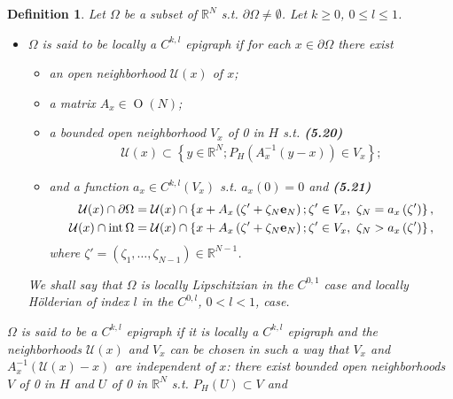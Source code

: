 \documentclass{book}
\numberwithin{equation}{section}
\newtheorem{definition}{Definition}[section]
\begin{document}
\begin{enumerate}
    \begin{definition}
        Let $\Omega$ be a subset of $\mathbb{R}^N$ s.t. $\partial\Omega\ne\emptyset$. Let $k\ge 0$, $0\le l\le 1$.
        \begin{itemize}
            \item[(i)] $\Omega$ is said to be \emph{locally a $C^{k,l}$ epigraph} if for each $x\in\partial\Omega$ there exist
            \begin{itemize}
                \item[(a)] an open neighborhood $\mathcal{U}(x)$ of $x$;
                \item[(b)] a matrix $A_x\in\operatorname{O}(N)$;
                \item[(c)] a bounded open neighborhood $V_x$ of 0 in $H$ s.t. \textbf{(5.20)}
                \begin{align*}
                    \mathcal{U}(x)\subset\left\{y\in\mathbb{R}^N;P_H\left(A_x^{-1}\left(y - x\right)\right)\in V_x\right\};
                \end{align*}
                \item[(d)] and a function $a_x\in C^{k,l}(V_x)$ s.t. $a_x(0) = 0$ and \textbf{(5.21)}
                \begin{align*}
                    \mathcal{U}(x)\cap\partial\Omega &= \mathcal{U}(x)\cap\left\{x + A_x\left(\zeta' + \zeta_N{\bf e}_N\right);\zeta'\in V_x,\ \zeta_N = a_x\left(\zeta'\right)\right\},\\
                    \mathcal{U}(x)\cap\operatorname{int}\Omega &= \mathcal{U}(x)\cap\left\{x + A_x\left(\zeta' + \zeta_N{\bf e}_N\right);\zeta'\in V_x,\ \zeta_N > a_x\left(\zeta'\right)\right\},
                \end{align*}
                where $\zeta' = \left(\zeta_1,\ldots,\zeta_{N - 1}\right)\in\mathbb{R}^{N - 1}$.
            \end{itemize}
            We shall say that $\Omega$ is \emph{locally Lipschitzian} in the $C^{0,1}$ case and \emph{locally Hölderian of index $l$} in the $C^{0,l}$, $0 < l < 1$, case.
        \end{itemize}
        \item[(ii)] $\Omega$ is said to be a \emph{$C^{k,l}$ epigraph} if it is locally a $C^{k,l}$ epigraph and the neighborhoods $\mathcal{U}(x)$ and $V_x$ can be chosen in such a way that $V_x$ and $A_x^{-1}\left(\mathcal{U}(x) - x\right)$ are independent of $x$: there exist bounded open neighborhoods $V$ of 0 in $H$ and $U$ of 0 in $\mathbb{R}^N$ s.t. $P_H(U)\subset V$ and

\end{definition}
\end{enumerate}
\end{document}
